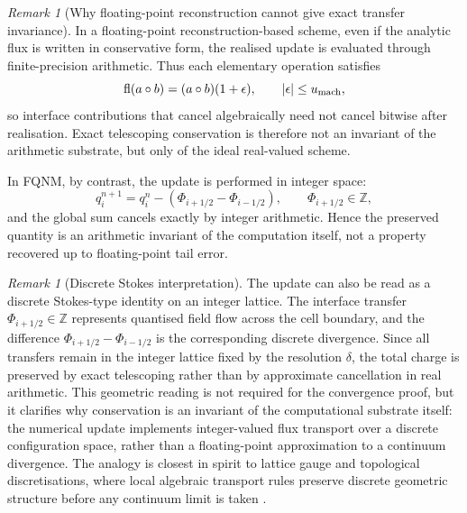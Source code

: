 \documentclass[sn-basic]{sn-jnl}
\theoremstyle{plain}
\theoremstyle{remark}
\newtheorem{remark}[theorem]{Remark}
\begin{document}
\begin{remark}[Why floating-point reconstruction cannot give exact transfer invariance]
\label{rem:fp_no_exact_invariance}
In a floating-point reconstruction-based scheme, even if the analytic flux is written in conservative form, the realised update is evaluated through finite-precision arithmetic. Thus each elementary operation satisfies
\[
\operatorname{fl}(a\circ b)=(a\circ b)(1+\epsilon),
\qquad |\epsilon|\le u_{\rm mach},
\]
so interface contributions that cancel algebraically need not cancel bitwise after realisation. Exact telescoping conservation is therefore not an invariant of the arithmetic substrate, but only of the ideal real-valued scheme.

In FQNM, by contrast, the update is performed in integer space:
\[
q_i^{n+1}=q_i^n-(\Phi_{i+1/2}-\Phi_{i-1/2}),\qquad \Phi_{i+1/2}\in\mathbb Z,
\]
and the global sum cancels exactly by integer arithmetic. Hence the preserved quantity is an arithmetic invariant of the computation itself, not a property recovered up to floating-point tail error.
\end{remark}

\begin{remark}[Discrete Stokes interpretation]
\label{rem:discrete_stokes_interpretation}
The update can also be read as a discrete Stokes-type identity on an integer lattice. The interface transfer \(\Phi_{i+1/2}\in\mathbb Z\) represents quantised field flow across the cell boundary, and the difference \(\Phi_{i+1/2}-\Phi_{i-1/2}\) is the corresponding discrete divergence. Since all transfers remain in the integer lattice fixed by the resolution \(\delta\), the total charge is preserved by exact telescoping rather than by approximate cancellation in real arithmetic. This geometric reading is not required for the convergence proof, but it clarifies why conservation is an invariant of the computational substrate itself: the numerical update implements integer-valued flux transport over a discrete configuration space, rather than a floating-point approximation to a continuum divergence. The analogy is closest in spirit to lattice gauge and topological discretisations, where local algebraic transport rules preserve discrete geometric structure before any continuum limit is taken \cite{creutzQuarksGluonsLattices1983,wittenQuantumFieldTheory1989,diracQuantisedSingularitiesElectromagnetic1931,bredonTopologyGeometry1993,hatcherAlgebraicTopology2002}.
\end{remark}
\end{document}
